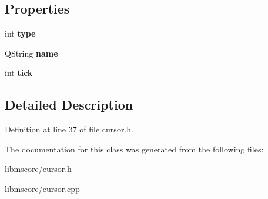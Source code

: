\subsection*{Properties}
\begin{DoxyCompactItemize}
\item 
\mbox{\label{class_ms_1_1_element_w_ad9ae52fe9fb1e97fd87b9574ce47b53c}} 
int {\bfseries type}
\item 
\mbox{\label{class_ms_1_1_element_w_a144ea87693466f7386d2c66e32013574}} 
Q\+String {\bfseries name}
\item 
\mbox{\label{class_ms_1_1_element_w_ab17699840856421a70320b2987b0a54d}} 
int {\bfseries tick}
\end{DoxyCompactItemize}


\subsection{Detailed Description}


Definition at line 37 of file cursor.\+h.



The documentation for this class was generated from the following files\+:\begin{DoxyCompactItemize}
\item 
libmscore/cursor.\+h\item 
libmscore/cursor.\+cpp\end{DoxyCompactItemize}
